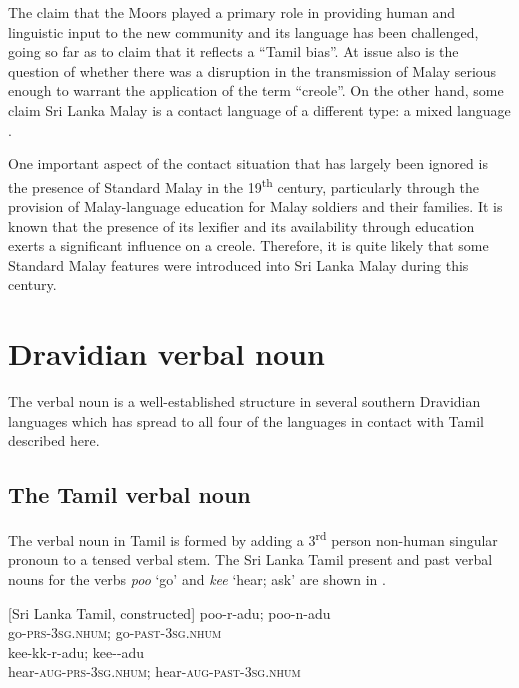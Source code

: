 The claim that the Moors played a primary role in providing human and linguistic input to the new community and its language has been challenged, \citet{Ansaldo2008genesis} going so far as to claim that it reflects a ``Tamil bias''. At issue also is the question of whether there was a disruption in the transmission of Malay serious enough to warrant the application of the term ``creole''. On the other hand, some claim Sri Lanka Malay is a contact language of a different type: a mixed language \citep{Meakinstoappear}.

One important aspect of the contact situation that has largely been ignored is the presence of Standard Malay in the 19\textsuperscript{th} century, particularly through the provision of Malay-language education for Malay soldiers and their families. It is known that the presence of its lexifier and its availability through education exerts a significant influence on a creole. Therefore, it is quite likely that some Standard Malay features were introduced into Sri Lanka Malay during this century.

\section{Dravidian verbal noun}

The verbal noun is a well-established structure in several southern Dravidian languages \citep[See][155 for descriptive sources]{Gair1986}  which has spread to all four of the languages in contact with Tamil described here. 

\subsection{The Tamil verbal noun}

The verbal noun in Tamil is formed by adding a 3\textsuperscript{rd} person non-human singular pronoun to a tensed verbal stem. The Sri Lanka Tamil present and past verbal nouns for the verbs \textit{poo} `go' and \textit{kee{\textrtaill}} `hear; ask' are shown in . 

\ea\label{smith:ex:5} 
{}[Sri Lanka Tamil, constructed]
\ea
\gll poo-r-adu; poo-n-adu \\
go-\textsc{prs}-3\textsc{sg}.\textsc{nhum}; go-\textsc{past}-3\textsc{sg}.\textsc{nhum} \\
\ex
\gll kee-kk\footnotemark{}{}-r-adu; kee-{\textrtailt}{\textrtailt}-adu \\
hear-\textsc{aug}-\textsc{prs}-3\textsc{sg}.\textsc{nhum}; hear-\textsc{aug}-\textsc{past}-3\textsc{sg}.\textsc{nhum}\\
\z
\z
{}

